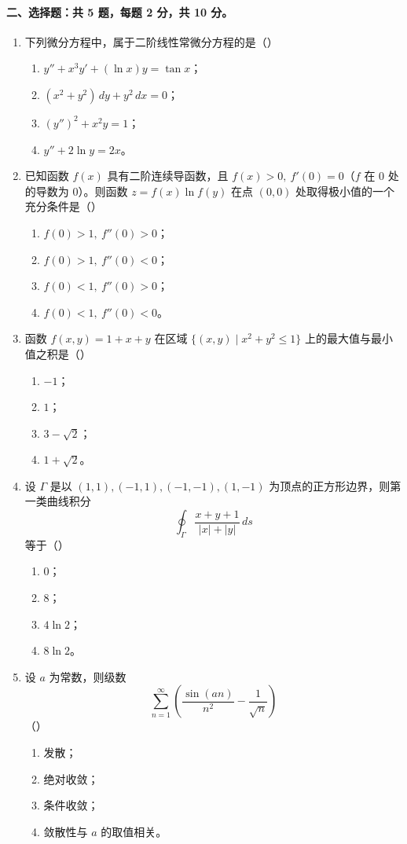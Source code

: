 \paragraph*{二、选择题：共 5 题，每题 2 分，共 10 分。}
\begin{enumerate}
  \item 下列微分方程中，属于二阶线性常微分方程的是（\quad）
  \begin{enumerate}
    \item $y''+x^3y'+(\ln x)y=\tan x$；
    \item $(x^2+y^2)\,dy+y^2\,dx=0$；
    \item $(y'')^2+x^2y=1$；
    \item $y''+2\ln y=2x$。
  \end{enumerate}
  \item 已知函数 $f(x)$ 具有二阶连续导函数，且 $f(x)>0,\ f'(0)=0$（$f$ 在 $0$ 处的导数为 $0$）。则函数 $z=f(x)\ln f(y)$ 在点 $(0,0)$ 处取得极小值的一个充分条件是（\quad）
  \begin{enumerate}
    \item $f(0)>1,\ f''(0)>0$；
    \item $f(0)>1,\ f''(0)<0$；
    \item $f(0)<1,\ f''(0)>0$；
    \item $f(0)<1,\ f''(0)<0$。
  \end{enumerate}
  \item 函数 $f(x,y)=1+x+y$ 在区域 $\{(x,y)\mid x^2+y^2\le 1\}$ 上的最大值与最小值之积是（\quad）
  \begin{enumerate}
    \item $-1$；
    \item $1$；
    \item $3-\sqrt2$；
    \item $1+\sqrt2$。
  \end{enumerate}
  \item 设 $\Gamma$ 是以 $(1,1),(-1,1),(-1,-1),(1,-1)$ 为顶点的正方形边界，则第一类曲线积分
  \[
    \oint_\Gamma \frac{x+y+1}{|x|+|y|}\,ds
  \]
  等于（\quad）
  \begin{enumerate}
    \item $0$；
    \item $8$；
    \item $4\ln 2$；
    \item $8\ln 2$。
  \end{enumerate}
  \item 设 $a$ 为常数，则级数
  \[
    \sum_{n=1}^{\infty}\left(\frac{\sin(an)}{n^2}-\frac1{\sqrt n}\right)
  \]
  （\quad）
  \begin{enumerate}
    \item 发散；
    \item 绝对收敛；
    \item 条件收敛；
    \item 敛散性与 $a$ 的取值相关。
  \end{enumerate}
\end{enumerate}

